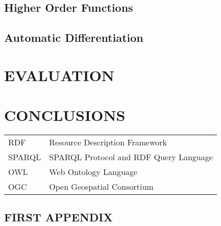 \documentclass[ack,preface]{dithesis}
\begin{document}
   \section{Higher Order Functions}

    \section{Automatic Differentiation}

\chapter{EVALUATION}

\chapter{CONCLUSIONS}

\backmatter

\abbreviations
\begin{center}
	\renewcommand{\arraystretch}{1.5}
	\begin{longtable}{ l @{\qquad} l }
	\toprule
	RDF    & Resource Description Framework \\
	SPARQL & SPARQL Protocol and RDF Query Language \\
	OWL    & Web Ontology Language \\
	OGC    & Open Geospatial Consortium \\
	\bottomrule
	\end{longtable}
\end{center}

\begin{appendix}
\appendixstartedtrue

{}

\chapter{FIRST APPENDIX}

\end{appendix}



\end{document}
